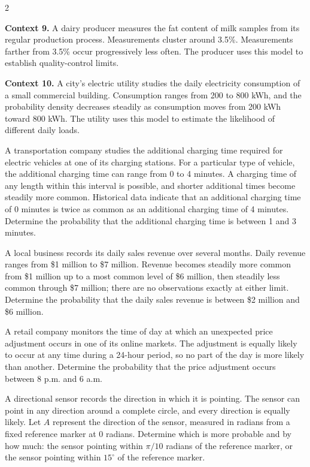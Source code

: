 \begin{multicols}{2}
{			\textbf{Context 9.} A dairy producer measures the fat content of milk
			samples from its regular production process. Measurements cluster around
			3.5\%.
			Measurements farther from 3.5\% occur progressively less often. The
			producer uses this model to establish quality-control limits.
			
			\columnbreak
			
			\textbf{Context 10.} A city's electric utility studies the daily
			electricity consumption of a small commercial building. Consumption
			ranges from 200 to 800 kWh, and the probability density decreases
			steadily as consumption moves from 200 kWh toward 800 kWh. The utility
			uses this model to estimate the likelihood of different daily loads.
		}
		
		{
		A transportation company studies the additional charging time
		required for electric vehicles at one of its charging stations. For a
		particular type of vehicle, the additional charging time can range
		from 0 to 4 minutes. A charging time of any length within this interval
		is possible, and shorter additional times become steadily more common.
		Historical data indicate that an additional charging time of 0 minutes
		is twice as common as an additional charging time of 4 minutes. Determine the probability that the additional charging time is between 1 and 3 minutes.
		}
		
		{
		A local business records its daily sales revenue over several months.
		Daily revenue ranges from \$1 million to \$7 million. Revenue becomes
		steadily more common from \$1 million up to a most common level of
		\$6 million, then steadily less common through \$7 million; there are
		no observations exactly at either limit. Determine the probability that the daily sales revenue is between
		\$2 million and \$6 million.
		}
	
		{
		A retail company monitors the time of day at which an unexpected
		price adjustment occurs in one of its online markets. The adjustment
		is equally likely to occur at any time during a 24-hour period,
		so no part of the day is more likely than another. Determine the probability that the price adjustment occurs between
		8 p.m. and 6 a.m. 
		}
		
		\columnbreak
		
		{
		A directional sensor records the direction in which it is pointing.
		The sensor can point in any direction around a complete circle, and
		every direction is equally likely. Let \(A\) represent the direction
		of the sensor, measured in radians from a fixed reference marker at
		\(0\) radians. Determine which is more probable and by how much: the sensor	pointing within \(\pi/10\) radians of the reference marker,
		or the sensor pointing within \(15^\circ\) of the reference
		marker.
		}
		

\end{multicols}

